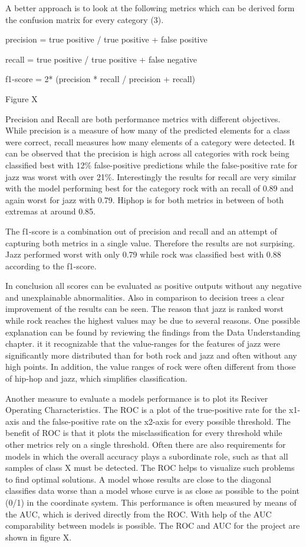 A better approach is to look at the following metrics which can be derived form the confusion matrix for every category (3). 

precision = true positive / true positive + false positive

recall    = true positive / true positive + false negative 

f1-score  = 2* (precision * recall / precision + recall)

Figure X

Precision and Recall are both performance metrics with different objectives. While precision is a measure of how many of the 
predicted elements for a class were correct, recall measures how many elements of a category were detected. It can be observed that 
the precision is high across all categories with rock being classified best with 12\% false-positive predictions while 
the false-positive rate for jazz was worst with over 21\%. Interestingly the results for recall are very similar with the model 
performing best for the category rock with an recall of 0.89 and again worst for jazz with 0.79. Hiphop is for both metrics in 
between of both extremas at around 0.85. 

The f1-score is a combination out of precision and recall and an attempt of capturing both metrics in a single value. Therefore
the results are not surpising. Jazz performed worst with only 0.79 while rock was classified best with 0.88 according to the 
f1-score. 

In conclusion all scores can be evaluated as positive outputs without any negative and unexplainable abnormalities. Also in comparison 
to decision trees a clear improvement of the results can be seen. The reason that jazz is ranked worst while rock reaches the 
highest values may be due to several reasons. One possible explanation can be found by reviewing the findings from the Data 
Understanding chapter. it it recognizable that the value-ranges for the features of jazz were significantly more distributed 
than for both rock and jazz and often without any high points. In addition, the value ranges of rock were often different from 
those of hip-hop and jazz, which simplifies classification. 

Another measure to evaluate a models performance is to plot its Reciver Operating Characteristics. The ROC is a plot of the true-positive
rate for the x1-axis and the false-positive rate on the x2-axis for every possible threshold. The benefit of ROC is that it plots the 
misclassification for every threshold while other metrics rely on a single threshold. Often there are also requirements for 
models in which the overall accuracy plays a subordinate role, such as that all samples of class X must be detected. The ROC helps 
to visualize such problems to find optimal solutions. A model whose results are close to the diagonal classifies data worse than a 
model whose curve is as close as possible to the point (0/1) in the coordinate system. This performance is often measured by means of 
the AUC, which is derived directly from the ROC. With help of the AUC comparability between models is possible. The ROC and AUC for 
the project are shown in figure X.

